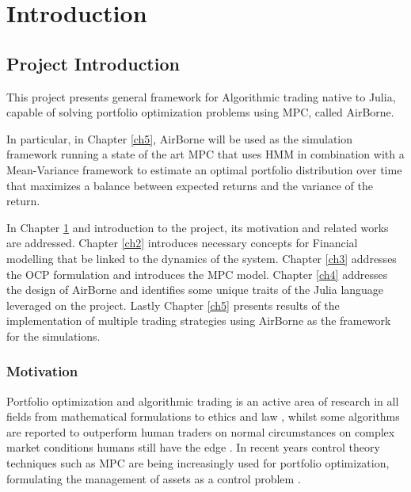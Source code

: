 \chapter{Introduction}
\label{ch1}

\adjustmtc %
\singlespacing %
\minitoc %
\doublespacing %


\section{Project Introduction}
This project presents general framework for Algorithmic trading native to Julia, capable of solving portfolio optimization problems using \ac{MPC}, called AirBorne. 

In particular, in Chapter \ref{ch5}, AirBorne will be used as the simulation framework running a state of the art \ac{MPC} that uses \ac{HMM} in combination with a Mean-Variance framework to estimate an optimal portfolio distribution over time that maximizes a balance between expected returns and the variance of the return.

In Chapter \ref{ch1} and introduction to the project, its motivation and related works are addressed. Chapter \ref{ch2} introduces necessary concepts for Financial modelling that be linked to the dynamics of the system.  Chapter \ref{ch3} addresses the \ac{OCP} formulation and introduces the \ac{MPC} model.  Chapter \ref{ch4} addresses the design of AirBorne and identifies some unique traits of the Julia language leveraged on the project. Lastly Chapter \ref{ch5} presents results of the implementation of multiple trading strategies using AirBorne as the framework for the simulations.

\subsection{Motivation}

Portfolio optimization and algorithmic trading is an active area of research in all fields from mathematical formulations \cite{RL2022,2022OptimalControl} to ethics and law  \cite{ethicsAndLaw2022}, whilst some algorithms are reported to outperform human traders on normal circumstances on complex market conditions humans still have the edge \cite{algorithmicTradingWithHumanTraders}. In recent years control theory techniques such as \ac{MPC} are being increasingly used for portfolio optimization, formulating the management of assets as a control problem \cite{MultiPeriod_PO_mpc}. 

